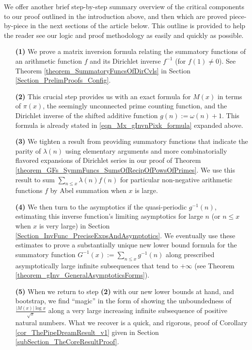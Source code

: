 \documentclass[11pt,reqno,a4letter]{article}
\numberwithin{figure}{section}
\numberwithin{table}{section}
\theoremstyle{plain}
\numberwithin{theorem}{section}
\theoremstyle{definition}
\begin{document}
We offer another brief step-by-step summary overview of the critical components 
to our proof outlined in the introduction above, 
and then which are proved piece-by-piece in the next sections of the article below. 
This outline is provided to help 
the reader see our logic and proof methodology as easily and quickly as possible. 
\begin{itemize} 

\item[\textbf{(1)}] We prove a matrix inversion formula relating the summatory 
           functions of an arithmetic function $f$ and its Dirichlet inverse $f^{-1}$ (for $f(1) \neq 0$). 
           See 
           Theorem \ref{theorem_SummatoryFuncsOfDirCvls} in 
           Section \ref{Section_PrelimProofs_Config}.  
\item[\textbf{(2)}] This crucial step provides us with an exact formula for $M(x)$ in terms of $\pi(x)$, the seemingly 
           unconnected prime counting function, and the 
           Dirichlet inverse of the shifted additive function $g(n) := \omega(n)+1$. This 
           formula is already stated in \eqref{eqn_Mx_gInvnPixk_formula} expanded above.  
\item[\textbf{(3)}] We tighten a result from \cite[\S 7]{MV} providing summatory functions that indicate the parity of 
           $\lambda(n)$ using elementary arguments and more combinatorially flavored expansions of Dirichlet series in 
           our proof of Theorem \ref{theorem_GFs_SymmFuncs_SumsOfRecipOfPowsOfPrimes}. 
           We use this result to sum $\sum_{n \leq x} \lambda(n) f(n)$ for particular non-negative arithmetic 
           functions $f$ by Abel summation when $x$ is large. 
\item[\textbf{(4)}] We then turn to the asymptotics if the quasi-periodic $g^{-1}(n)$, estimating this inverse function's 
           limiting asymptotics for large $n$ (or $n \leq x$ when $x$ is very large) in 
           Section \ref{Section_InvFunc_PreciseExpsAndAsymptotics}. 
           We eventually use these estimates to prove a substantially unique new lower bound formula 
           for the summatory function $G^{-1}(x) := \sum_{n \leq x} g^{-1}(n)$ along prescribed asymptotically large 
           infinite subsequences that tend to $+\infty$ (see Theorem \ref{theorem_gInv_GeneralAsymptoticsForms}). 
\item[\textbf{(5)}] When we return to step \textbf{(2)} 
           with our new lower bounds at hand, and bootstrap, we find ``magic'' in the form of 
           showing the unboundedness of $\frac{|M(x)| \log x}{\sqrt{x}}$ 
           along a very large increasing infinite subsequence 
           of positive natural numbers. What we recover is a quick, and rigorous, proof of 
           Corollary \ref{cor_ThePipeDreamResult_v1} given in 
           Section \ref{subSection_TheCoreResultProof}. 
           
\end{itemize} 
\end{document}
